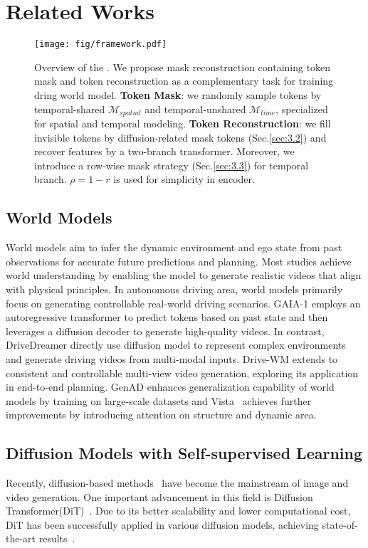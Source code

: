 \section{Related Works}
\label{sec:related}
\begin{figure*}[t]
  \centering
   \texttt{[image: fig/framework.pdf]}
   \caption{Overview of the \ourmethod. We propose mask reconstruction containing token mask and token reconstruction as a complementary task for training dring world model. \textbf{Token Mask}: we randomly sample tokens by temporal-shared $\mathcal{M}_{spatial}$ and temporal-unshared $\mathcal{M}_{time}$, specialized for spatial and temporal modeling. \textbf{Token Reconstruction}: we fill invisible tokens by diffusion-related mask tokens (Sec.\ref{sec:3.2}) and recover features by a two-branch transformer. Moreover, we introduce a row-wise mask strategy (Sec.\ref{sec:3.3}) for temporal branch. $\rho=1-r$ is used for simplicity in encoder.}
   \label{fig:framework}
\end{figure*}

\subsection{World Models}
World models aim to infer the dynamic environment and ego state from past observations for accurate future predictions and planning. Most studies achieve world understanding by enabling the model to generate realistic videos that align with physical principles. In autonomous driving area, world models primarily focus on generating controllable real-world driving scenarios. GAIA-1 \cite{gaia1} employs an autoregressive transformer to predict tokens based on past state and then leverages a diffusion decoder to generate high-quality videos. In contrast, DriveDreamer \cite{drivedreamer} directly use diffusion model to represent complex environments and generate driving videos from multi-modal inputs. Drive-WM \cite{drive-wm} extends to consistent and controllable multi-view video generation, exploring its application in end-to-end planning. GenAD \cite{genad} enhances generalization capability of world models by training on large-scale datasets and Vista~\cite{vista} achieves further improvements by introducing attention on structure and dynamic area.

\subsection{Diffusion Models with Self-supervised Learning}
Recently, diffusion-based methods~\cite{videodiffusionmodel, guo2023animatediff, henschel2024streamingt2v, latentdiffusion, controlnet} have become the mainstream of image and video generation. 
One important advancement in this field is Diffusion Transformer(DiT)~\cite{dit}. Due to its better scalability and lower computational cost, DiT has been successfully applied in various diffusion models, achieving state-of-the-art results~\cite{zheng2024viton, dive, sd3, feng2024dit4edit}. 

